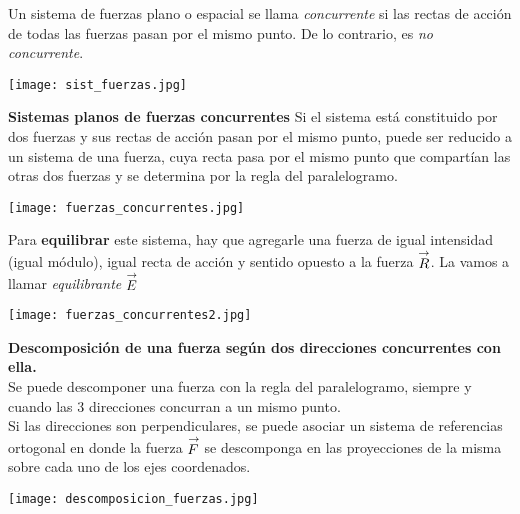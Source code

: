 Un sistema de fuerzas plano o espacial se llama \emph{concurrente} si las rectas de acción de todas las fuerzas pasan por el mismo punto. De lo contrario, es \emph{no concurrente}.
\begin{center}
    \texttt{[image: sist\_fuerzas.jpg]}
\end{center}

\textbf{Sistemas planos de fuerzas concurrentes}
Si el sistema está constituido por dos fuerzas y sus rectas de acción pasan por el mismo punto, puede ser reducido a un sistema de una fuerza, cuya recta pasa por el mismo punto que compartían las otras dos fuerzas y se determina por la regla del paralelogramo.
\begin{center}
    \texttt{[image: fuerzas\_concurrentes.jpg]}
\end{center}
Para \textbf{equilibrar} este sistema, hay que agregarle una fuerza de igual intensidad (igual módulo), igual recta de acción y sentido opuesto a la fuerza $\stackrel{\to}{R}$. La vamos a llamar \emph{equilibrante} $\stackrel{\to}{E}$
\begin{center}
    \texttt{[image: fuerzas\_concurrentes2.jpg]}
\end{center}

\textbf{Descomposición de una fuerza según dos direcciones concurrentes con ella.}\\
Se puede descomponer una fuerza con la regla del paralelogramo, siempre y cuando las 3 direcciones concurran a un mismo punto.\\
Si las direcciones son perpendiculares, se puede asociar un sistema de referencias ortogonal en donde la fuerza $\stackrel{\to}{F}$ se descomponga en las proyecciones de la misma sobre cada uno de los ejes coordenados.
\begin{center}
    \texttt{[image: descomposicion\_fuerzas.jpg]}
\end{center}

